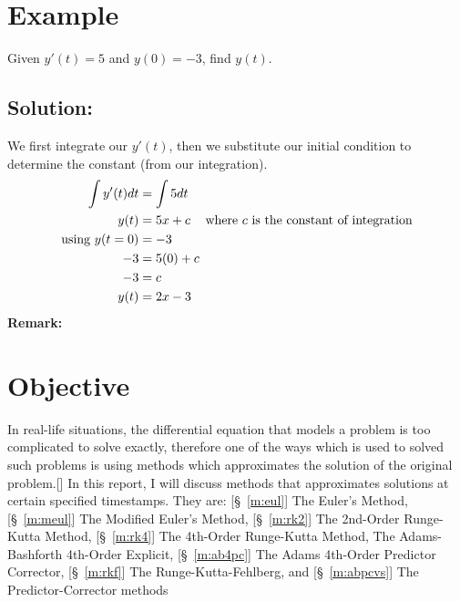 \documentclass[12pt,oneside]{book}
\begin{document}
\begin{spacing}{1.2}
				\newpage
				
			\section*{Example}
				Given $ y'(t) = 5 $ and $ y(0) = -3 $, find $ y(t) $.
				\subsection*{Solution:}
					We first integrate our $ y'(t) $, then we substitute our initial condition to determine the constant (from our integration).
					\begin{equation*}
						\begin{split}
							\int y'(t) dt & = \int 5 dt \\
							 y(t) & = 5x + c \hspace*{0.3cm} \text{ where $ c $ is the constant of integration} \\
							 \text{using } y(t = 0) & = -3 \\
							 -3 & = 5(0) + c \\
							 -3 & = c \\
							 y(t) & = 2x - 3
						\end{split}
					\end{equation*}
					\textbf{Remark: }  
			
			
			\section{Objective}
				In real-life situations, the differential equation that models a problem is too complicated to solve exactly, therefore one of the ways which is used to solved such problems is using methods which approximates the solution of the original problem.[] In this report, I will discuss methods that approximates solutions at certain specified timestamps. \newline
				They are: [\S\ \ref{m:eul}] The Euler's Method, [\S\ \ref{m:meul}] The Modified Euler's Method, [\S\ \ref{m:rk2}] The 2nd-Order Runge-Kutta Method, [\S\ \ref{m:rk4}] The 4th-Order Runge-Kutta Method, \newline [\S\ \ref{m:ab4e}] The Adams-Bashforth 4th-Order Explicit, [\S\ \ref{m:ab4pc}] The Adams 4th-Order Predictor Corrector, [\S\ \ref{m:rkf}] The Runge-Kutta-Fehlberg, and [\S\ \ref{m:abpcvs}] The Predictor-Corrector methods
			
		\end{spacing}
		
\end{document}
